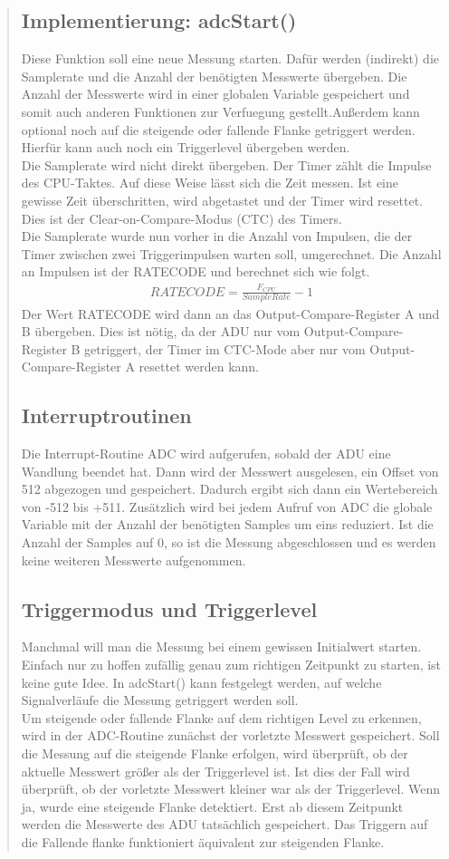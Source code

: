 \begin{quote}
\subsection{Implementierung: adcStart()}
Diese Funktion soll eine neue Messung starten. Dafür werden (indirekt) die Samplerate und die Anzahl der benötigten Messwerte übergeben. Die Anzahl der Messwerte wird in einer globalen Variable gespeichert und somit auch anderen Funktionen zur Verfuegung gestellt.Außerdem kann optional noch auf die steigende oder fallende Flanke getriggert werden. Hierfür kann auch noch ein Triggerlevel übergeben werden.\\ Die Samplerate wird nicht direkt übergeben. Der Timer zählt die Impulse des CPU-Taktes. Auf diese Weise lässt sich die Zeit messen. Ist eine gewisse Zeit überschritten, wird abgetastet und der Timer wird resettet. Dies ist der Clear-on-Compare-Modus (CTC) des Timers.\\ Die Samplerate wurde nun vorher in die Anzahl von Impulsen, die der Timer zwischen zwei Triggerimpulsen warten soll, umgerechnet. Die Anzahl an Impulsen ist der RATECODE und berechnet sich wie folgt. 
\begin{align}
RATECODE = \frac{F_{CPU}}{SampleRate}-1 
\end{align}
Der Wert RATECODE wird dann an das Output-Compare-Register A und B übergeben. Dies ist nötig, da der ADU nur vom Output-Compare-Register B getriggert, der Timer im CTC-Mode aber nur vom Output-Compare-Register A resettet werden kann.  
\subsection{Interruptroutinen}
Die Interrupt-Routine ADC wird aufgerufen, sobald der ADU eine Wandlung beendet hat. Dann wird der Messwert ausgelesen, ein Offset von 512 abgezogen und gespeichert. Dadurch ergibt sich dann ein Wertebereich von -512 bis +511. Zusätzlich wird bei jedem Aufruf von ADC die globale Variable mit der Anzahl der benötigten Samples um eins reduziert. Ist die Anzahl der Samples auf 0, so ist die Messung abgeschlossen und es werden keine weiteren Messwerte aufgenommen.
\subsection{Triggermodus und Triggerlevel}
Manchmal will man die Messung bei einem gewissen Initialwert starten. Einfach nur zu hoffen zufällig genau zum richtigen Zeitpunkt zu starten, ist keine gute Idee. In adcStart() kann festgelegt werden, auf welche Signalverläufe die Messung getriggert werden soll.\\
Um steigende oder fallende Flanke auf dem richtigen Level zu erkennen, wird in der ADC-Routine zunächst der vorletzte Messwert gespeichert. Soll die Messung auf die steigende Flanke erfolgen, wird überprüft, ob der aktuelle Messwert größer als  der Triggerlevel ist. Ist dies der Fall wird überprüft, ob der vorletzte Messwert kleiner war als der Triggerlevel. Wenn ja, wurde eine steigende Flanke detektiert. Erst ab diesem Zeitpunkt werden die Messwerte des ADU tatsächlich gespeichert.
Das Triggern auf die Fallende flanke funktioniert äquivalent zur steigenden Flanke.

\end{quote}
